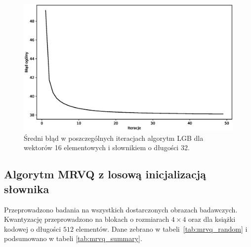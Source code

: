 \documentclass{article}
\begin{document}
\begin{figure}[H]
  \centering
  \includegraphics[width=.9\linewidth]{images/lbg_4x4_32_mean_iterations.eps}
  \caption{Średni błąd w poszczególnych iteracjach algorytm LGB dla wektorów 16 elementowych i słownikiem o długości 32.}
  \label{fig:lbg_iterations_mean}
\end{figure}

\subsection{Algorytm MRVQ z losową inicjalizacją słownika}

Przeprowadzono badania na wszystkich dostarczonych obrazach badawczych. Kwantyzację przeprowadzono na blokach o rozmiarach $4 \times 4$ oraz dla książki
kodowej o długości $512$ elementów. Dane zebrano w \mbox{tabeli \ref{tab:mrvq_random}} i podsumowano w tabeli \mbox{\ref{tab:mrvq_summary}}.
\end{document}
